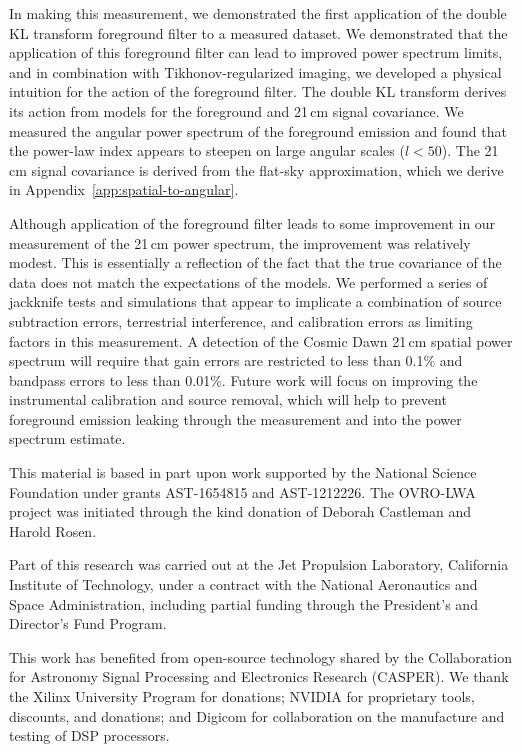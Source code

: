 \documentclass[twocolumn]{aastex62}
\begin{document}
In making this measurement, we demonstrated the first application of the double KL transform
foreground filter to a measured dataset. We demonstrated that the application of this foreground
filter can lead to improved power spectrum limits, and in combination with Tikhonov-regularized
imaging, we developed a physical intuition for the action of the foreground filter.  The double KL
transform derives its action from models for the foreground and 21\,cm signal covariance. We
measured the angular power spectrum of the foreground emission and found that the power-law index
appears to steepen on large angular scales ($l < 50$). The 21\,cm signal covariance is derived from
the flat-sky approximation, which we derive in Appendix~\ref{app:spatial-to-angular}.

Although application of the foreground filter leads to some improvement in our measurement of the
21\,cm power spectrum, the improvement was relatively modest. This is essentially a reflection of
the fact that the true covariance of the data does not match the expectations of the models. We
performed a series of jackknife tests and simulations that appear to implicate a combination of
source subtraction errors, terrestrial interference, and calibration errors as limiting factors in
this measurement. A detection of the Cosmic Dawn 21\,cm spatial power spectrum will require that
gain errors are restricted to less than 0.1\% and bandpass errors to less than 0.01\%.  Future work
will focus on improving the instrumental calibration and source removal, which will help to prevent
foreground emission leaking through the measurement and into the power spectrum estimate.

\acknowledgments

This material is based in part upon work supported by the National Science Foundation under grants
AST-1654815 and AST-1212226. The OVRO-LWA project was initiated through the kind donation of Deborah
Castleman and Harold Rosen.

Part of this research was carried out at the Jet Propulsion Laboratory, California Institute of
Technology, under a contract with the National Aeronautics and Space Administration, including
partial funding through the President's and Director's Fund Program.

This work has benefited from open-source technology shared by the Collaboration for Astronomy Signal
Processing and Electronics Research (CASPER).  We thank the Xilinx University Program for donations;
NVIDIA for proprietary tools, discounts, and donations; and Digicom for collaboration on the
manufacture and testing of DSP processors.
\end{document}
